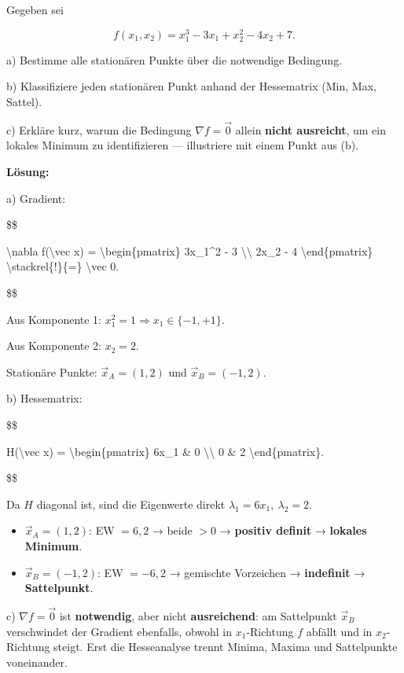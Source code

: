 \documentclass[11pt, a4paper]{article}
\begin{document}
Gegeben sei

\[
f(x_1, x_2) = x_1^3 - 3x_1 + x_2^2 - 4x_2 + 7.
\]


a) Bestimme alle stationären Punkte über die notwendige Bedingung.


b) Klassifiziere jeden stationären Punkt anhand der Hessematrix (Min, Max, Sattel).


c) Erkläre kurz, warum die Bedingung $\nabla f = \vec 0$ allein \textbf{nicht ausreicht}, um ein lokales Minimum zu identifizieren — illustriere mit einem Punkt aus (b).


\textbf{Lösung:}


a) Gradient:

\$\$

\textbackslash{}nabla f(\textbackslash{}vec x) = \textbackslash{}begin\{pmatrix\} 3x\_1\textasciicircum{}2 - 3 \textbackslash{}\textbackslash{} 2x\_2 - 4 \textbackslash{}end\{pmatrix\} \textbackslash{}stackrel\{!\}\{=\} \textbackslash{}vec 0.

\$\$

Aus Komponente 1: $x_1^2 = 1 \Rightarrow x_1 \in \{-1, +1\}$.

Aus Komponente 2: $x_2 = 2$.

Stationäre Punkte: $\vec x_A = (1, 2)$ und $\vec x_B = (-1, 2)$.


b) Hessematrix:

\$\$

H(\textbackslash{}vec x) = \textbackslash{}begin\{pmatrix\} 6x\_1 \& 0 \textbackslash{}\textbackslash{} 0 \& 2 \textbackslash{}end\{pmatrix\}.

\$\$

Da $H$ diagonal ist, sind die Eigenwerte direkt $\lambda_1 = 6x_1,\ \lambda_2 = 2$.


\begin{itemize}
  \item $\vec x_A = (1,2)$: EW $= 6, 2$ → beide $> 0$ → \textbf{positiv definit} → \textbf{lokales Minimum}.
  \item $\vec x_B = (-1,2)$: EW $= -6, 2$ → gemischte Vorzeichen → \textbf{indefinit} → \textbf{Sattelpunkt}.
\end{itemize}

c) $\nabla f = \vec 0$ ist \textbf{notwendig}, aber nicht \textbf{ausreichend}: am Sattelpunkt $\vec x_B$ verschwindet der Gradient ebenfalls, obwohl in $x_1$-Richtung $f$ abfällt und in $x_2$-Richtung steigt. Erst die Hesseanalyse trennt Minima, Maxima und Sattelpunkte voneinander.
\end{document}
